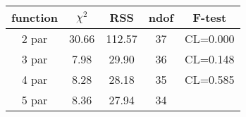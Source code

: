 \begin{tabular}{c|c|c|c|c}
function & $\chi^2$ & RSS & ndof & F-test \\
\hline
2 par & 30.66 & 112.57 & 37 & CL=0.000 \\
3 par & 7.98 & 29.90 & 36 & CL=0.148 \\
4 par & 8.28 & 28.18 & 35 & CL=0.585 \\
5 par & 8.36 & 27.94 & 34 & \\
\hline
\end{tabular}
